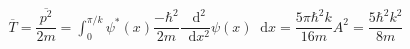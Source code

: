 \documentclass{article}
\newcommand*{\md}{\mathop{}\!\mathrm{d}}
\begin{document}
\begin{equation*}
  \begin{aligned}
    \overline{T} = \overline{\dfrac{p^2}{2m} } =
    \int_0^{\pi/k} \psi^{*} \left( x \right) \dfrac{- \hbar^2}{2m} \dfrac{\md^2}{\md x^2} \psi \left( x \right) \md x = \dfrac{5\pi \hbar^2 k}{16m} A^2 = \dfrac{5 \hbar^2 k^2}{8m}    
  \end{aligned}
\end{equation*}
\end{document}
